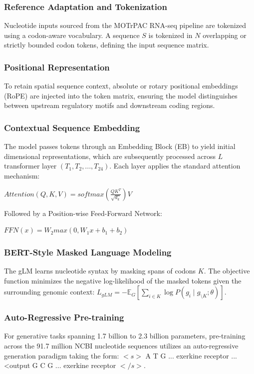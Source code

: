 \documentclass[11pt]{article}
\begin{document}
\subsubsection{Reference Adaptation and Tokenization}
Nucleotide inputs sourced from the MOTrPAC RNA-seq pipeline are tokenized using a codon-aware vocabulary. A sequence $S$ is tokenized in $N$ overlapping or strictly bounded codon tokens, defining the input sequence matrix. 
\subsubsection{Positional Representation}
To retain spatial sequence context, absolute or rotary positional embeddings (RoPE) are injected into the token matrix, ensuring the model distinguishes between upstream regulatory motifs and downstream coding regions.
\subsubsection{Contextual Sequence Embedding}
The model passes tokens through an Embedding Block (EB) to yield initial dimensional representations, which are subsequently processed across $L$ transformer layer $(T_1,T_2,...,T_{24})$. Each layer applies the standard attention mechanism: 

$Attention(Q,K,V)=softmax(\frac{QK^T}{\sqrt{d_k}})V$

Followed by a Position-wise Feed-Forward Network:

$FFN(x) = W_2max(0,W_1x+b_1 + b_2)$

\subsubsection{BERT-Style Masked Language Modeling}
The gLM learns nucleotide syntax by masking spans of codons $K$. The objective function minimizes the negative log-likelihood of the masked tokens given the surrounding genomic context: $L_{gLM} = -\mathbb{E}_G\left[\sum_{i\in K}\log P(g_i \mid g_{\setminus K};\theta)\right]$.

\subsubsection{Auto-Regressive Pre-training}
For generative tasks spanning 1.7 billion to 2.3 billion parameters, pre-training across the 91.7 million NCBI nucleotide sequences utilizes an auto-regressive generation paradigm taking the form: $<s>$ A T G ... exerkine receptor ... <output G C G ... exerkine receptor $</s>$. 
\end{document}
